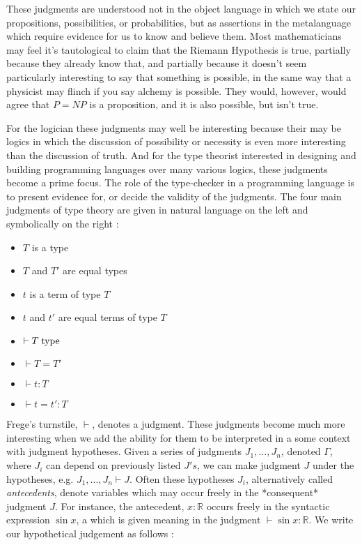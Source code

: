 These judgments are understood not in the object language in which we state our
propositions, possibilities, or probabilities, but as assertions in the
metalanguage which require evidence for us to know and believe them. Most
mathematicians may feel it's tautological to claim that the Riemann Hypothesis is
true, partially because they already know that, and partially because it doesn't
seem particularly interesting to say that something is possible, in the same way
that a physicist may flinch if you say alchemy is possible. They would, however,
would agree that $P = NP$ is a proposition, and it is also possible, but isn't
true.

For the logician these judgments may well be interesting because their may be
logics in which the discussion of possibility or necessity is even more
interesting than the discussion of truth. And for the type theorist interested
in designing and building programming languages over many various logics, these
judgments become a prime focus. The role of the type-checker in a programming
language is to present evidence for, or decide the validity of the judgments.
The four main judgments of type theory are given in natural language on the left
and symbolically on the right :

\begin{multicols}{2}
\begin{itemize}
\item $T$ is a type
\item $T$ and $T'$ are equal types
\item $t$ is a term of type $T$
\item $t$ and $t'$ are equal terms of type $T$
\item $\vdash T \; {\rm type}$
\item $\vdash T = T'$
\item $\vdash t:T$
\item $\vdash t = t':T$
\end{itemize}
\end{multicols}

Frege's turnstile, $\vdash$, denotes a judgment. These judgments become much more interesting when we add the ability for them to
be interpreted in a some context with judgment hypotheses. Given a series of
judgments $J_1,...,J_n$, denoted $\Gamma$, where $J_i$ can depend on previously
listed $J's$, we can make judgment $J$ under the hypotheses, e.g. $J_1,...,J_n
\vdash J$. Often these hypotheses $J_i$, alternatively called \emph{antecedents},
denote variables which may occur freely in the *consequent* judgment $J$. For
instance, the antecedent, $x : \mathbb{R}$ occurs freely in the syntactic
expression $\sin x$, a which is given meaning in the judgment $\vdash \sin x { :
} \mathbb{R}$. We write our hypothetical judgement as follows :


